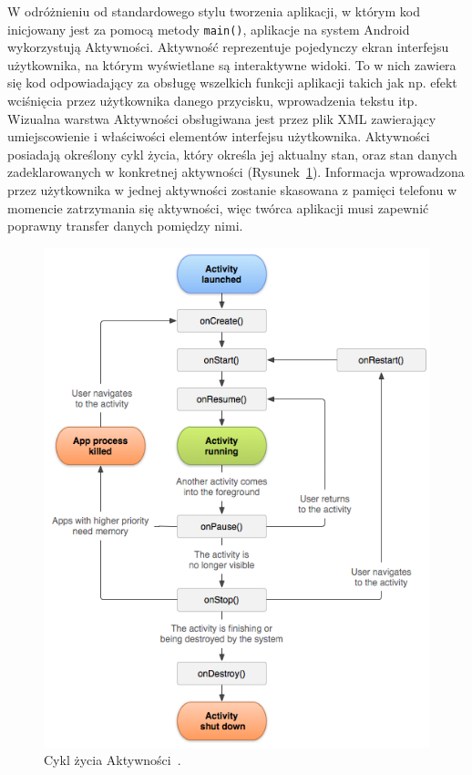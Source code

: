     W odróżnieniu od standardowego stylu tworzenia aplikacji, w którym kod inicjowany jest za pomocą metody \texttt{main()}, aplikacje na system Android wykorzystują Aktywności. Aktywność reprezentuje 
    pojedynczy ekran interfejsu użytkownika, na którym wyświetlane są interaktywne widoki. To w nich zawiera się kod odpowiadający za obsługę wszelkich funkcji aplikacji takich jak np. efekt wciśnięcia
    przez użytkownika danego przycisku, wprowadzenia tekstu itp. Wizualna warstwa Aktywności obsługiwana jest przez plik XML zawierający umiejscowienie i właściwości elementów interfejsu użytkownika.
    Aktywności posiadają określony cykl życia, który określa jej aktualny stan, oraz stan danych zadeklarowanych w konkretnej aktywności (Rysunek~\ref{lifecycle}). Informacja wprowadzona przez 
    użytkownika w jednej aktywności zostanie skasowana z pamięci telefonu w momencie zatrzymania się aktywności, więc twórca aplikacji musi zapewnić poprawny transfer danych pomiędzy nimi. 

    \begin{figure}[!ht]%
        \centering
        \includegraphics[scale=0.45]{src/activity_lifecycle.png}
        \caption{Cykl życia Aktywności~\cite{LIFECYCLE}.\label{lifecycle}}
        \qquad
    \end{figure} 

